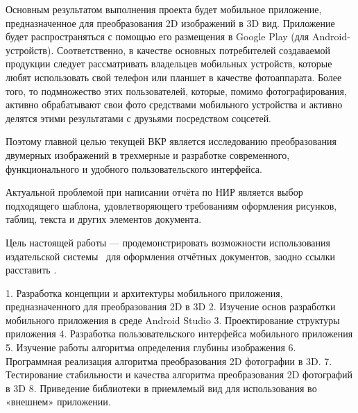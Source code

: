 Основным результатом выполнения проекта будет мобильное приложение, предназначенное для преобразования 2D изображений в 3D вид. Приложение будет распространяться с помощью его размещения в Google Play (для Android-устройств). Соответственно, в качестве основных потребителей создаваемой продукции следует рассматривать владельцев мобильных устройств, которые любят использовать свой телефон или планшет в качестве фотоаппарата. Более того, то подмножество этих пользователей, которые, помимо фотографирования, активно обрабатывают свои фото средствами мобильного устройства и активно делятся этими результатами с друзьями посредством соцсетей.

Поэтому главной целью текущей ВКР является исследованию	преобразования двумерных изображений в трехмерные и разработке современного, функционального и удобного пользовательского интерфейса. 

Актуальной проблемой при написании отчёта по НИР является выбор подходящего шаблона, удовлетворяющего требованиям оформления рисунков, таблиц, текста и других элементов документа.

Цель настоящей работы --- продемонстрировать возможности использования издательской системы \LaTeXe\ для оформления отчётных документов, заодно ссылки расставить \cite{SoetaertRJ2010}.

1. Разработка концепции и архитектуры мобильного приложения, предназначенного для преобразования 2D в 3D
2. Изучение основ разработки мобильного приложения в среде Android Studio
3. Проектирование структуры приложения
4. Разработка пользовательского интерфейса мобильного приложения
5. Изучение работы алгоритма определения глубины изображения
6. Программная реализация алгоритма преобразования 2D фотографии в 3D.
7. Тестирование стабильности и качества алгоритма преобразования 2D фотографий в 3D
8. Приведение библиотеки в приемлемый вид для использования во «внешнем» приложении.

